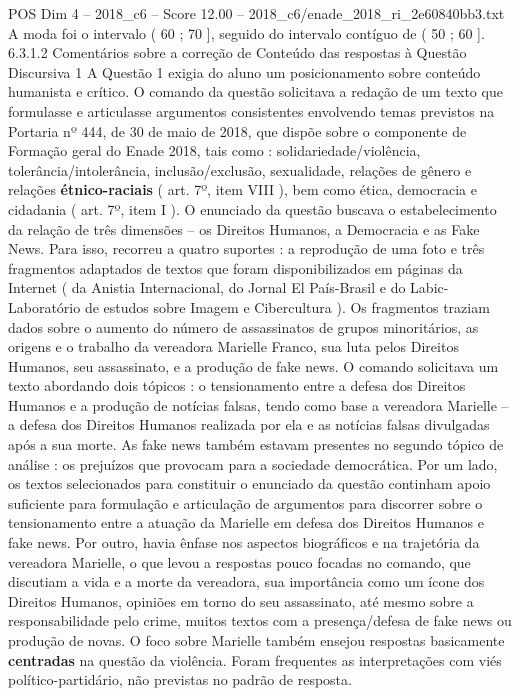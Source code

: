 \begin{textsample}{POS Dim 4 – 2018\_c6 – Score 12.00 – 2018\_c6/enade\_2018\_ri\_2e60840bb3.txt}
A moda foi o intervalo ( 60 ; 70 ], seguido do intervalo contíguo de ( 50 ; 60 ]. 6.3.1.2 Comentários sobre a correção de Conteúdo das respostas à Questão Discursiva 1 A Questão 1 exigia do aluno um posicionamento sobre conteúdo humanista e crítico.
O comando da questão solicitava a redação de um texto que formulasse e articulasse argumentos consistentes envolvendo temas previstos na Portaria nº 444, de 30 de maio de 2018, que dispõe sobre o componente de Formação geral do Enade 2018, tais como : solidariedade/violência, tolerância/intolerância, inclusão/exclusão, sexualidade, relações de gênero e relações \textbf{étnico-raciais} ( art. 7º, item VIII ), bem como ética, democracia e cidadania ( art. 7º, item I ).
O enunciado da questão buscava o estabelecimento da relação de três dimensões – os Direitos Humanos, a Democracia e as Fake News.
Para isso, recorreu a quatro suportes : a reprodução de uma foto e três fragmentos adaptados de textos que foram disponibilizados em páginas da Internet ( da Anistia Internacional, do Jornal El País-Brasil e do Labic-Laboratório de estudos sobre Imagem e Cibercultura ).
Os fragmentos traziam dados sobre o aumento do número de assassinatos de grupos minoritários, as origens e o trabalho da vereadora Marielle Franco, sua luta pelos Direitos Humanos, seu assassinato, e a produção de fake news.
O comando solicitava um texto abordando dois tópicos : o tensionamento entre a defesa dos Direitos Humanos e a produção de notícias falsas, tendo como base a vereadora Marielle – a defesa dos Direitos Humanos realizada por ela e as notícias falsas divulgadas após a sua morte.
As fake news também estavam presentes no segundo tópico de análise : os prejuízos que provocam para a sociedade democrática.
Por um lado, os textos selecionados para constituir o enunciado da questão continham apoio suficiente para formulação e articulação de argumentos para discorrer sobre o tensionamento entre a atuação da Marielle em defesa dos Direitos Humanos e fake news.
Por outro, havia ênfase nos aspectos biográficos e na trajetória da vereadora Marielle, o que levou a respostas pouco focadas no comando, que discutiam a vida e a morte da vereadora, sua importância como um ícone dos Direitos Humanos, opiniões em torno do seu assassinato, até mesmo sobre a responsabilidade pelo crime, muitos textos com a presença/defesa de fake news ou produção de novas.
O foco sobre Marielle também ensejou respostas basicamente \textbf{centradas} na questão da violência.
Foram frequentes as interpretações com viés político-partidário, não previstas no padrão de resposta.

\end{textsample}
